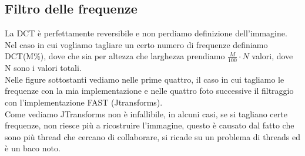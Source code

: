 \documentclass[12pt]{article}
\begin{document}
\subsection{Filtro delle frequenze}
La DCT \`e perfettamente reversibile e non perdiamo definizione dell'immagine. \\
Nel caso in cui vogliamo tagliare un certo numero di frequenze definiamo DCT(M\%), dove che sia per altezza che larghezza prendiamo $\frac{M}{100} \cdot N$ valori, dove N sono i valori totali. \\
Nelle figure sottostanti vediamo nelle prime quattro, il caso in cui tagliamo le frequenze con la mia implementazione e nelle quattro foto successive il filtraggio con l'implementazione FAST (Jtransforms). \\
Come vediamo JTransforms non \`e infallibile, in alcuni casi, se si tagliano certe frequenze, non riesce pi\`u a ricostruire l'immagine, questo \`e causato dal fatto che sono pi\`u thread che cercano di collaborare, si ricade su un problema di threads ed \`e un baco noto. \\
\end{document}
